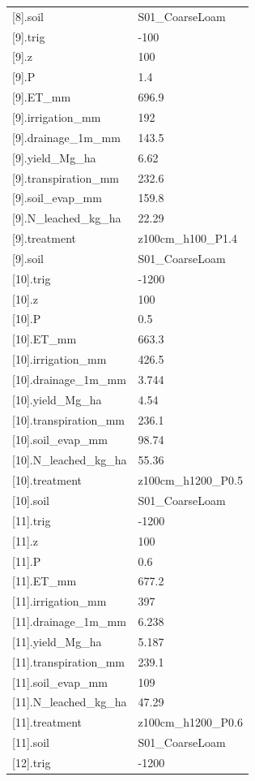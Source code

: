 {\begin{longtable}{p{}p{}}
{}[8].soil & S01\_CoarseLoam\\
{}[9].trig & -100\\
{}[9].z & 100\\
{}[9].P & 1.4\\
{}[9].ET\_mm & 696.9\\
{}[9].irrigation\_mm & 192\\
{}[9].drainage\_1m\_mm & 143.5\\
{}[9].yield\_Mg\_ha & 6.62\\
{}[9].transpiration\_mm & 232.6\\
{}[9].soil\_evap\_mm & 159.8\\
{}[9].N\_leached\_kg\_ha & 22.29\\
{}[9].treatment & z100cm\_h100\_P1.4\\
{}[9].soil & S01\_CoarseLoam\\
{}[10].trig & -1200\\
{}[10].z & 100\\
{}[10].P & 0.5\\
{}[10].ET\_mm & 663.3\\
{}[10].irrigation\_mm & 426.5\\
{}[10].drainage\_1m\_mm & 3.744\\
{}[10].yield\_Mg\_ha & 4.54\\
{}[10].transpiration\_mm & 236.1\\
{}[10].soil\_evap\_mm & 98.74\\
{}[10].N\_leached\_kg\_ha & 55.36\\
{}[10].treatment & z100cm\_h1200\_P0.5\\
{}[10].soil & S01\_CoarseLoam\\
{}[11].trig & -1200\\
{}[11].z & 100\\
{}[11].P & 0.6\\
{}[11].ET\_mm & 677.2\\
{}[11].irrigation\_mm & 397\\
{}[11].drainage\_1m\_mm & 6.238\\
{}[11].yield\_Mg\_ha & 5.187\\
{}[11].transpiration\_mm & 239.1\\
{}[11].soil\_evap\_mm & 109\\
{}[11].N\_leached\_kg\_ha & 47.29\\
{}[11].treatment & z100cm\_h1200\_P0.6\\
{}[11].soil & S01\_CoarseLoam\\
{}[12].trig & -1200\\

\end{longtable}}
